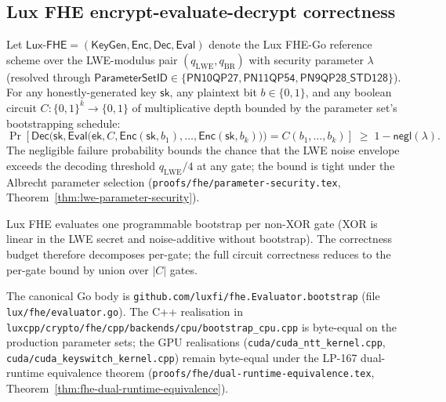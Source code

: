 
\subsection*{Lux FHE encrypt-evaluate-decrypt correctness}

\begin{theorem}
\label{thm:fhe-correctness}
Let $\mathsf{Lux\text{-}FHE} = (\mathsf{KeyGen}, \mathsf{Enc}, \mathsf{Dec}, \mathsf{Eval})$
denote the Lux FHE-Go reference scheme over the LWE-modulus pair $(q_{\mathrm{LWE}}, q_{\mathrm{BR}})$
with security parameter $\lambda$ (resolved through $\mathsf{ParameterSetID} \in
\{\mathsf{PN10QP27}, \mathsf{PN11QP54}, \mathsf{PN9QP28\_STD128}\}$). For any honestly-generated
key $\mathsf{sk}$, any plaintext bit $b \in \{0, 1\}$, and any boolean circuit
$C : \{0, 1\}^k \to \{0, 1\}$ of multiplicative depth bounded by the parameter set's
bootstrapping schedule:
\[
  \Pr\!\left[
    \mathsf{Dec}\bigl(\mathsf{sk},
      \mathsf{Eval}\bigl(\mathsf{ek}, C, \mathsf{Enc}(\mathsf{sk}, b_1), \ldots,
                          \mathsf{Enc}(\mathsf{sk}, b_k)\bigr)\bigr)
    = C(b_1, \ldots, b_k)
  \right]
  \;\geq\; 1 - \mathsf{negl}(\lambda).
\]
The negligible failure probability bounds the chance that the LWE noise envelope
exceeds the decoding threshold $q_{\mathrm{LWE}} / 4$ at any gate; the bound is
tight under the Albrecht parameter selection
(\texttt{proofs/fhe/parameter-security.tex}, Theorem~\ref{thm:lwe-parameter-security}).
\end{theorem}

\begin{remark}
\label{rem:per-gate-bootstrap}
Lux FHE evaluates one programmable bootstrap per non-XOR gate (XOR is
linear in the LWE secret and noise-additive without bootstrap). The
correctness budget therefore decomposes per-gate; the full circuit
correctness reduces to the per-gate bound by union over $|C|$ gates.
\end{remark}

\begin{remark}
\label{rem:fhe-reference-impls}
The canonical Go body is \texttt{github.com/luxfi/fhe.Evaluator.bootstrap}
(file \texttt{lux/fhe/evaluator.go}). The C++ realisation in
\texttt{luxcpp/crypto/fhe/cpp/backends/cpu/bootstrap\_cpu.cpp} is byte-equal
on the production parameter sets; the GPU realisations
(\texttt{cuda/cuda\_ntt\_kernel.cpp}, \texttt{cuda/cuda\_keyswitch\_kernel.cpp})
remain byte-equal under the LP-167 dual-runtime equivalence theorem
(\texttt{proofs/fhe/dual-runtime-equivalence.tex},
Theorem~\ref{thm:fhe-dual-runtime-equivalence}).
\end{remark}
